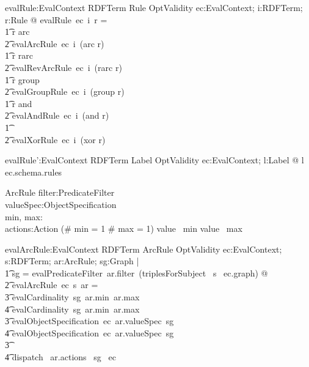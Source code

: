 \begin{gendef}
   evalRule:EvalContext \fun RDFTerm \fun Rule \fun OptValidity
\where
   \forall ec:EvalContext; i:RDFTerm; r:Rule @ evalRule~ec~i~r = \\
\t1 \IF r \in \ran arc \\
\t2 \THEN evalArcRule~ec~i~(arc \entryFor r) \\
\t1 \ELSE \IF r \in \ran rarc \\
\t2 \THEN evalRevArcRule~ec~i~(rarc \entryFor r) \\
\t1 \ELSE \IF r \in \ran group \\
\t2 \THEN evalGroupRule~ec~i~(group \entryFor r) \\
\t1 \ELSE \IF r \in \ran and \\
\t2 \THEN evalAndRule~ec~i~(and \entryFor r) \\
\t1 \ELSE \\
\t2 evalXorRule~ec~i~(xor \entryFor r)
\end{gendef}
        

\begin{gendef}
   evalRule':EvalContext \fun RDFTerm \fun Label \fun OptValidity
\where
   \forall ec:EvalContext; l:Label @ l \in \dom ec.schema.rules
\end{gendef}
		

\begin{schema}{ArcRule}
   filter:PredicateFilter \\
   valueSpec:ObjectSpecification \\
   min, max:\optional[\nat] \\
   actions:\power Action
\where
   (\# min = 1 \land \# max = 1) \implies value~ min \leq value~ max
\end{schema}
		

\begin{gendef}
   evalArcRule:EvalContext \fun RDFTerm \fun ArcRule \fun OptValidity
\where
   \forall ec:EvalContext; s:RDFTerm; ar:ArcRule; sg:Graph | \\ 
\t1 sg = evalPredicateFilter~ar.filter~(triplesForSubject~ s~ ec.graph) @ \\
\t2		evalArcRule~ec~s~ar = \\
\t3 \IF evalCardinality~sg~ar.min~ar.max \neq \pass \\
\t4 \THEN evalCardinality~sg~ar.min~ar.max \\
\t3 \ELSE \IF evalObjectSpecification~ec~ar.valueSpec~sg \neq \pass \\
\t4 \THEN evalObjectSpecification~ec~ar.valueSpec~sg \\
\t3 \ELSE \\
\t4  dispatch~ ar.actions~ sg~ ec 
\end{gendef}
		

